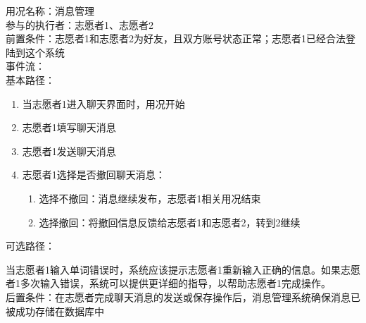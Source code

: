 \begin{framed}
\noindent
用况名称：消息管理\\
参与的执行者：志愿者1、志愿者2\\
前置条件：志愿者1和志愿者2为好友，且双方账号状态正常；志愿者1已经合法登陆到这个系统\\
事件流：\\
基本路径：
\begin{enumerate}[itemsep=2pt,topsep=0pt,parsep=0pt,itemindent=1em]
    \item 当志愿者1进入聊天界面时，用况开始
    \item 志愿者1填写聊天消息
    \item 志愿者1发送聊天消息
    \item 志愿者1选择是否撤回聊天消息：
    \begin{enumerate}[itemsep=2pt,topsep=0pt,parsep=0pt,itemindent=1em]
          \item 选择不撤回：消息继续发布，志愿者1相关用况结束
          \item 选择撤回：将撤回信息反馈给志愿者1和志愿者2，转到2继续
      \end{enumerate}
\end{enumerate}
\noindent
可选路径：\par
    当志愿者1输入单词错误时，系统应该提示志愿者1重新输入正确的信息。如果志愿者1多次输入错误，系统可以提供更详细的指导，以帮助志愿者1完成操作。\\
后置条件：在志愿者完成聊天消息的发送或保存操作后，消息管理系统确保消息已被成功存储在数据库中
\end{framed}
